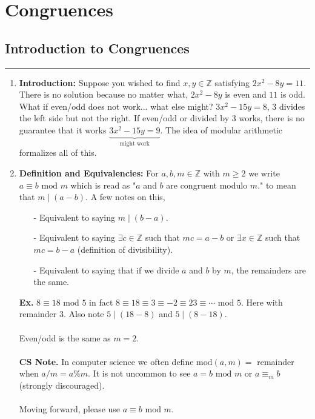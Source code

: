 \documentclass[class=article, crop=false]{standalone}
\def\integers{{\mathbb Z}}
\begin{document}
    
\section{Congruences}

\subsection{Introduction to Congruences}
\rule{\textwidth}{1pt}
\begin{enumerate}[1.]
	\item \textbf{Introduction:} Suppose you wished to find $x,y\in\integers$ satisfying $2x^2 -8y=11$. There is no solution
	because no matter what, $2x^2 -8y$ is even and $11$ is odd. What if even/odd does not work...
	what else might? $3x^2-15y=8$, 3 divides the left side but not the right.
	If even/odd or divided by 3 works, there is no guarantee that it works 
	$\underbrace{3x^2-15y=9}_{\text{might work}}$.
	The idea of modular arithmetic formalizes all of this.

	\item \textbf{Definition and Equivalencies:} 
	For $a,b,m\in\integers$ with $m\geq2$ we write $a\equiv b\mbox{ mod }m$ which is
	read as "$a$ and $b$ are congruent modulo $m$." to mean that $m\mid (a-b)$. A few notes on this,
	\begin{itemize}
		\item[-] Equivalent to saying $m\mid (b-a)$.
		\item[-] Equivalent to saying $\exists c\in\integers$ such that $mc=a-b$ or $\exists x\in\integers$
		such that $mc=b-a$ (definition of divisibility).
		\item[-] Equivalent to saying that if we divide $a$ and $b$ by $m$, the remainders are the same.
	\end{itemize}
	\textbf{Ex.} $8\equiv 18\mbox{ mod } 5$ in fact $8\equiv18\equiv3\equiv-2\equiv23\equiv\cdots\mbox{ mod }5$.
	Here with remainder 3. Also note $5\mid (18-8)$ and $5\mid (8-18)$.\\\\
	Even/odd is the same as $m=2$.\\\\
	\textbf{CS Note.} In computer science we often define $\mbox{mod}(a,m)= $ remainder when $a/m=a\%m$.
	It is not uncommon to see $a=b\mbox{ mod }m$ or $a\equiv_m b$ (strongly discouraged).\\\\
	Moving forward, please use $a\equiv b\mbox{ mod }m$.
	

\end{enumerate}
\end{document}
